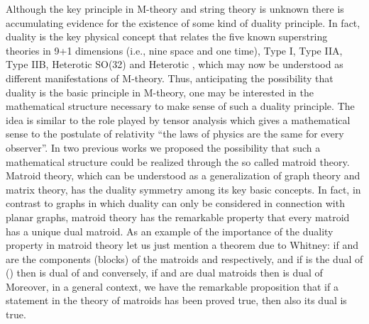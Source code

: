 \documentclass[a4paper,12pt]{article}
\begin{document}
Although the key principle in M-theory\coordHE{} and string theory\coordHE{} is
unknown there is accumulating evidence for the existence of some kind of
duality principle. In fact, duality is the key physical concept that relates
the five known superstring theories in 9+1 dimensions (i.e., nine space and
one time), Type I, Type IIA, Type IIB, Heterotic SO(32) and Heterotic \coordHE{}, which may now be understood as different manifestations
of M-theory. Thus, anticipating the possibility that duality is the basic
principle in M-theory, one may be interested in the mathematical structure
necessary to make sense of such a duality principle. The idea is similar to
the role played by tensor analysis which gives a mathematical sense to the
postulate of relativity ``the laws of physics are the same for every
observer''. In two previous works we proposed the possibility that such a
mathematical structure could be realized through the so called matroid
theory.\coordHE{} Matroid theory, which can be understood as a generalization of
graph theory and matrix theory, has the duality symmetry among its key basic
concepts. In fact, in contrast to graphs in which duality can only be
considered in connection with planar graphs, matroid theory has the
remarkable property that every matroid has a unique dual matroid. As an
example of the importance of the duality property in matroid theory let us
just mention a theorem due to Whitney\coordHE{}: if \coordHE{} and \coordHE{} are the components (blocks) of the
matroids \coordHE{} and \coordHE{} respectively, and if \coordHE{} is
the dual of \coordHE{} (\coordHE{}) then \coordHE{} is dual of \coordHE{} and
conversely, if \coordHE{} and \coordHE{} are dual matroids then \coordHE{} is dual of \coordHE{} Moreover, in a general context, we have the
remarkable proposition that if a statement \myHighlight{$\mu $}\coordHE{} in the theory of matroids
has been proved true, then also its dual \myHighlight{$\mu ^{\ast }$}\coordHE{} is true.
\end{document}
